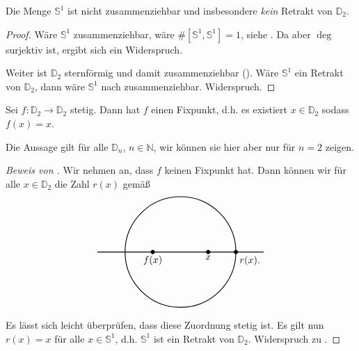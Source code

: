 \documentclass[
12pt, 
openany, 
a4paper, 
final,
fleqn, 
]{myclass}
\numberwithin{equation}{chapter}
\numberwithin{section}{chapter}
\newcommand{\Ss}{\mathbb S}
\newcommand{\DD}{\mathbb D}
\begin{document}
\begin{cor}\label{5.9}
Die Menge $ \mathbb{S}^{1} $ ist nicht zusammenziehbar und insbesondere \emph{kein} Retrakt von $ \mathbb{D}_{2} $. 
\end{cor}

\begin{proof}
Wäre $ \mathbb{S}^{1} $ zusammenziehbar, wäre $ \#[\mathbb{S}^{1}, \mathbb{S}^{1}] =1$, siehe . Da aber $ \deg $ surjektiv ist, ergibt sich ein Widerspruch.  

Weiter ist $\DD_2$ sternförmig und damit zusammenziehbar (). Wäre $\Ss^1$ ein Retrakt von $\DD_2$, dann wäre $\Ss^1$ nach  zusammenziehbar. Widerspruch.
\end{proof}

\begin{cor}\label{5.10}
Sei $ f: \mathbb{D}_{2}\to \mathbb{D}_{2} $ stetig. Dann hat $ f $ einen Fixpunkt, d.h. es existiert $ x\in \mathbb{D}_{2} $ sodass $ f(x) = x $. 
\end{cor}

\begin{rmk}\label{5.11}
Die Aussage gilt für alle $ \mathbb{D}_{n} $, $ n\in \mathbb{N}$, wir können sie hier aber nur für $ n=2 $ zeigen. 
\end{rmk}

\begin{proof}[Beweis von ]
Wir nehmen an, dass $ f $ keinen Fixpunkt hat. Dann können wir für alle $ x\in \mathbb{D}_{2} $ die Zahl $ r(x) $ gemäß
\[
\begin{tikzpicture}

\draw[thick] (0,0) circle(2);

\draw[thick] (-3, 0) -- (3, 0);

\filldraw (1, 0) circle (2pt); %
\filldraw (-1, 0) circle (2pt); %
\filldraw (2, 0) circle (2pt); %

\node[below] at (1, 0) {$x$};  %
\node[below] at (-1, 0) {$f(x)$};  %
\node[below right=0.01cm] at (2, 0) {$r(x)$.}; %

\end{tikzpicture}
\]
Es lässt sich leicht überprüfen, dass diese Zuordnung stetig ist. Es gilt nun $ r(x) = x $ für alle $ x\in \mathbb{S}^{1} $, d.h. $ \mathbb{S}^{1} $ ist ein Retrakt von $ \mathbb{D}_{2} $. Widerspruch zu .
\end{proof}
\end{document}
